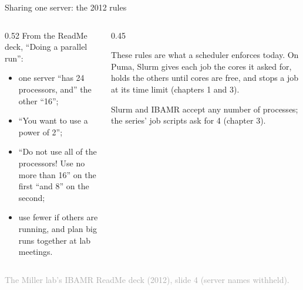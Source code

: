 \documentclass[aspectratio=169,11pt]{beamer}
\newcommand{\sourcecredit}[1]{\vfill\begin{flushright}\tiny\textcolor{DarkGray}{#1}\end{flushright}}
\begin{document}
\begin{frame}{Sharing one server: the 2012 rules}
\label{fr:rules}
\begin{columns}[T,onlytextwidth]
\begin{column}{0.52\textwidth}
\small From the ReadMe deck, ``Doing a parallel run'':
\begin{itemize}\setlength{\itemsep}{3pt}
  \item one server ``has 24 processors, and'' the other ``16'';
  \item ``You want to use a power of 2'';
  \item ``Do not use all of the processors! Use no more than 16'' on the first ``and 8'' on the second;
  \item use fewer if others are running, and plan big runs together at lab meetings.
\end{itemize}
\end{column}
\begin{column}{0.45\textwidth}
\begin{punchbox}
\small These rules are what a scheduler enforces today. On Puma, Slurm gives each job the cores it asked for, holds the others until cores are free, and stops a job at its time limit (chapters 1 and 3).
\end{punchbox}
\vspace{2mm}
\footnotesize Slurm and IBAMR accept any number of processes; the series' job scripts ask for 4 (chapter 3).
\end{column}
\end{columns}
\sourcecredit{The Miller lab's IBAMR ReadMe deck (2012), slide 4 (server names withheld).}
\end{frame}
\end{document}
